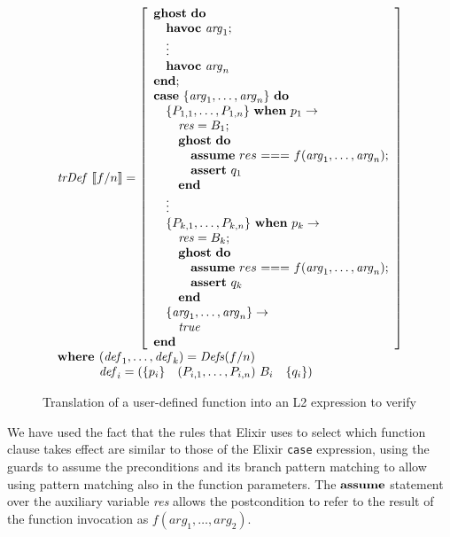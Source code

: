 \begin{figure}
\[
\begin{array}{l}
\trDef{f/n} = \left[ \begin{array}{l}
\ghostE~\doW\\
\quad\havocE~\mathit{arg}_1;\\
\quad\vdots\\
\quad\havocE~\mathit{arg}_n\\
\Wend;\\
\caseE~\{\mathit{arg}_1,\dots,\mathit{arg}_n\}~\doW \\
\quad \{P_{1,1},\dots,P_{1,n}\}~\whenE~p_1 \rightarrow\\ 
\quad\quad \mathit{res} = B_1; \\
\quad\quad \ghostE~\doW\\ 
\quad\quad\quad\assumeE~res~\mathit{===}~f(\mathit{arg}_1,\dots,\mathit{arg}_n);\\
\quad\quad\quad\assertE~q_1\\
\quad\quad \Wend\\
\quad\vdots\\
\quad \{P_{k,1},\dots,P_{k,n}\}~\whenE~p_k \rightarrow\\ 
\quad\quad \mathit{res} = B_k; \\
\quad\quad \ghostE~\doW\\ 
\quad\quad\quad\assumeE~res~\mathit{===}~f(\mathit{arg}_1,\dots,\mathit{arg}_n);\\
\quad\quad\quad\assertE~q_k\\
\quad\quad \Wend\\
\quad \{\mathit{arg}_1,\dots,\mathit{arg}_n\} \rightarrow\\
\quad\quad\true\\ 
\Wend
\end{array}
\right]\\
\textbf{where } (\mathit{def}_1, \dots, \mathit{def}_k) = \Defs{f/n}\\
\phantom{\textbf{where }} \mathit{def}_i = \left(\{ p_i \}  \quad (P_{i,1}, \dots, P_{i,n})~B_i \quad \{ q_i \} \right) 
\end{array}
\]
\caption{Translation of a user-defined function into an L2 expression to verify}
\label{fig:deftr}
\end{figure}

We have used the fact that the rules that Elixir uses to select which function
clause takes effect are similar to those of the Elixir \verb|case| expression,
using the guards to assume the preconditions and its branch pattern matching to
allow using pattern matching also in the function parameters. The $\textbf{assume}$
statement over the auxiliary variable \textit{res} allows the postcondition to
refer to the result of the function invocation as $f(\mathit{arg_1}, \dots,
\mathit{arg_2})$.

